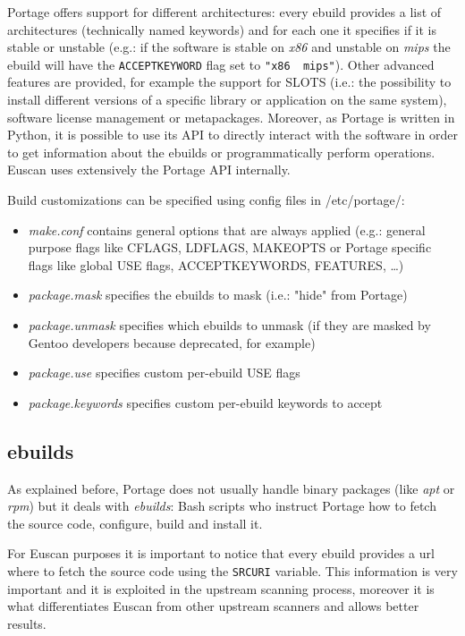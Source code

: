 Portage offers support for different architectures: every ebuild provides a list of architectures (technically named keywords) and for each one it specifies if it is stable or unstable (e.g.: if the software is stable on \emph{x86} and unstable on \emph{mips} the ebuild will have the \texttt{ACCEPT\textunderscore KEYWORD} flag set to \texttt{"x86 ~mips"}). 
Other advanced features are provided, for example the support for SLOTS (i.e.: the possibility to install different versions of a specific library or application on the same system), software license management or metapackages.
Moreover, as Portage is written in Python, it is possible to use its API to directly interact with the software in order to get information about the ebuilds or programmatically perform operations. Euscan uses extensively the Portage API internally.

\vspace{0.5cm}

Build customizations can be specified using config files in /etc/portage/:
\begin{itemize}
\item \emph{make.conf} contains general options that are always applied (e.g.: general  purpose flags like CFLAGS, LDFLAGS, MAKEOPTS or Portage specific flags like global USE flags, ACCEPT\textunderscore KEYWORDS, FEATURES, \ldots)
\item \emph{package.mask} specifies the ebuilds to mask (i.e.: "hide" from Portage)
\item \emph{package.unmask} specifies which ebuilds to unmask (if they are masked by Gentoo developers because deprecated, for example)
\item \emph{package.use} specifies custom per-ebuild USE flags
\item \emph{package.keywords} specifies custom per-ebuild keywords to accept
\end{itemize}


\subsection{ebuilds}
As explained before, Portage does not usually handle binary packages (like \emph{apt} or \emph{rpm}) but it deals with \emph{ebuilds}: Bash scripts who instruct Portage how to fetch the source code, configure, build and install it.

For Euscan purposes it is important to notice that every ebuild provides a url where to fetch the source code using the \texttt{SRC\textunderscore URI} variable. This information is very important and it is exploited in the upstream scanning process, moreover it is what differentiates Euscan from other upstream scanners and allows better results.

